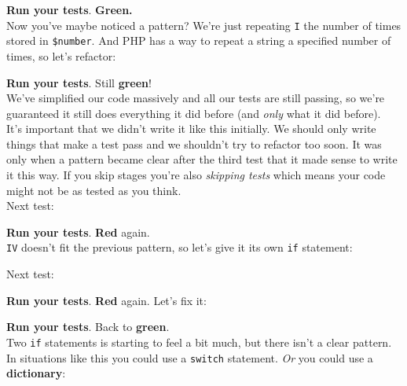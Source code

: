

\textbf{Run your tests}. \textbf{Green.}
\\

Now you've maybe noticed a pattern? We're just repeating \texttt{I} the number of times stored in \texttt{\$number}. And PHP has a way to repeat a string a specified number of times, so let's refactor:


\textbf{Run your tests}. Still \textbf{green}!
\\

We've simplified our code massively and all our tests are still passing, so we're guaranteed it still does everything it did before (and \textit{only} what it did before).
\\

It's important that we didn't write it like this initially. We should only write things that make a test pass and we shouldn't try to refactor too soon. It was only when a pattern became clear after the third test that it made sense to write it this way. If you skip stages you're also \textit{skipping tests} which means your code might not be as tested as you think.
\\


Next test:



\textbf{Run your tests}. \textbf{Red} again.
\\

\texttt{IV} doesn't fit the previous pattern, so let's give it its own \texttt{if} statement:




Next test:


\textbf{Run your tests}. \textbf{Red} again. Let's fix it:




\textbf{Run your tests}. Back to \textbf{green}.
\\

Two \texttt{if} statements is starting to feel a bit much, but there isn't a clear pattern. In situations like this you could use a \texttt{switch} statement. \textit{Or} you could use a \textbf{dictionary}:


